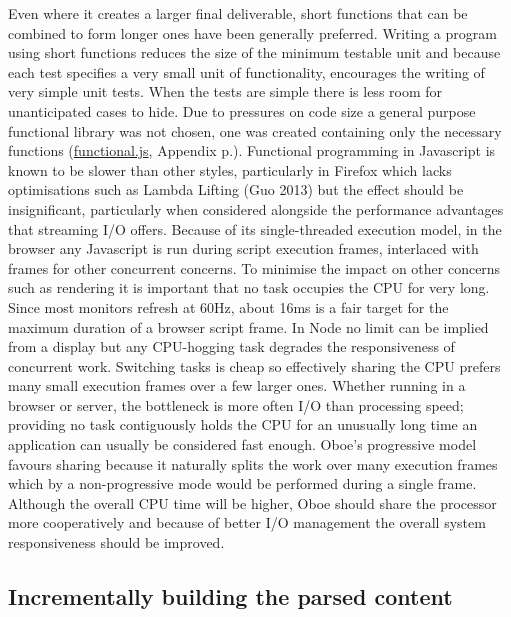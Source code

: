 \documentclass[12pt, ]{article}
\begin{document}
Even where it creates a larger final deliverable, short functions that
can be combined to form longer ones have been generally preferred.
Writing a program using short functions reduces the size of the minimum
testable unit and because each test specifies a very small unit of
functionality, encourages the writing of very simple unit tests. When
the tests are simple there is less room for unanticipated cases to hide.
Due to pressures on code size a general purpose functional library was
not chosen, one was created containing only the necessary functions
(\hyperref[headerux5ffunctional]{functional.js}, Appendix
p.\pageref{src_functional}). Functional programming in Javascript is
known to be slower than other styles, particularly in Firefox which
lacks optimisations such as Lambda Lifting (Guo 2013) but the effect
should be insignificant, particularly when considered alongside the
performance advantages that streaming I/O offers. Because of its
single-threaded execution model, in the browser any Javascript is run
during script execution frames, interlaced with frames for other
concurrent concerns. To minimise the impact on other concerns such as
rendering it is important that no task occupies the CPU for very long.
Since most monitors refresh at 60Hz, about 16ms is a fair target for the
maximum duration of a browser script frame. In Node no limit can be
implied from a display but any CPU-hogging task degrades the
responsiveness of concurrent work. Switching tasks is cheap so
effectively sharing the CPU prefers many small execution frames over a
few larger ones. Whether running in a browser or server, the bottleneck
is more often I/O than processing speed; providing no task contiguously
holds the CPU for an unusually long time an application can usually be
considered fast enough. Oboe's progressive model favours sharing because
it naturally splits the work over many execution frames which by a
non-progressive mode would be performed during a single frame. Although
the overall CPU time will be higher, Oboe should share the processor
more cooperatively and because of better I/O management the overall
system responsiveness should be improved.

\subsection{Incrementally building the parsed
content}\label{incrementally-building-the-parsed-content}
\end{document}
